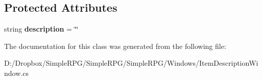 \subsection*{Protected Attributes}
\begin{DoxyCompactItemize}
\item 
\hypertarget{class_simple_r_p_g_1_1_windows_1_1_item_description_window_ac9367e28041ff7f0bfa406bd8d3e49b3}{string {\bfseries description} = \char`\"{}\char`\"{}}\label{class_simple_r_p_g_1_1_windows_1_1_item_description_window_ac9367e28041ff7f0bfa406bd8d3e49b3}

\end{DoxyCompactItemize}


The documentation for this class was generated from the following file\+:\begin{DoxyCompactItemize}
\item 
D\+:/\+Dropbox/\+Simple\+R\+P\+G/\+Simple\+R\+P\+G/\+Simple\+R\+P\+G/\+Windows/Item\+Description\+Window.\+cs\end{DoxyCompactItemize}
